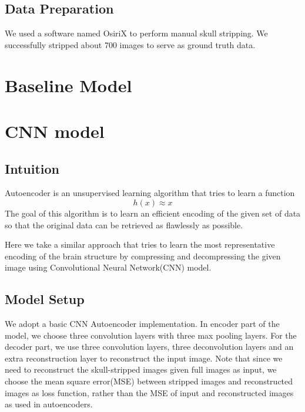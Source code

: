 \documentclass[conference]{IEEEtran}
\begin{document}
\subsection*{Data Preparation}
We used a software named OsiriX to perform manual skull stripping. We successfully stripped about 700 images to serve as ground truth data.

\section{Baseline Model}

\section{CNN model}
\subsection*{Intuition}
Autoencoder is an unsupervised learning algorithm that tries to learn a function
 \[ h(x) \approx x \]
 The goal of this algorithm is to learn an efficient encoding of the given set of data so that the original data can be retrieved as flawlessly as possible. 

Here we take a similar approach that tries to learn the most representative encoding of the brain structure by compressing and decompressing the given image using Convolutional Neural Network(CNN) model. 

\subsection*{Model Setup}
We adopt a basic CNN Autoencoder implementation. In encoder part of the model, we choose three convolution layers with three max pooling layers. For the decoder part, we use three convolution layers, three deconvolution layers and an extra reconstruction layer to reconstruct the input image. Note that since we need to reconstruct the skull-stripped images given full images as input, we choose the mean square error(MSE) between stripped images and reconstructed images as loss function, rather than the MSE of input and reconstructed images as used in autoencoders.
\end{document}
